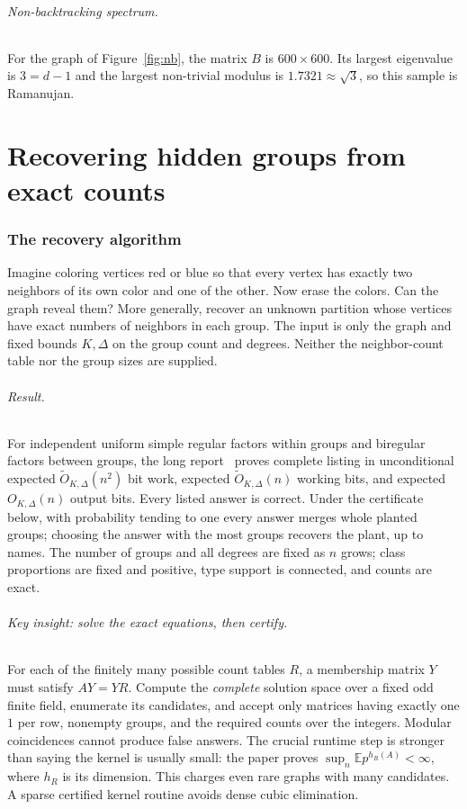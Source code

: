 \documentclass[11pt,letterpaper]{article}
\theoremstyle{definition}
\theoremstyle{remark}
\newcommand{\E}{\mathbb{E}}
\begin{document}
\paragraph{Non-backtracking spectrum.}
For the graph of Figure~\ref{fig:nb}, the matrix $B$ is $600\times600$. Its largest eigenvalue is
$3=d-1$ and the largest non-trivial modulus is $1.7321\approx\sqrt3$, so this sample is
Ramanujan.


\part{Recovering hidden groups from exact counts}
\section{The recovery algorithm}
Imagine coloring vertices red or blue so that every vertex has exactly two
neighbors of its own color and one of the other. Now erase the colors.
Can the graph reveal them? More generally, recover an unknown partition
whose vertices have exact numbers of neighbors in each group. The input is
only the graph and fixed bounds $K,\Delta$ on the group count and degrees.
Neither the neighbor-count table nor the group sizes are supplied.

\paragraph{Result.}
For independent uniform simple regular factors within groups and biregular
factors between groups, the long report~\cite{FullReport} proves complete
listing in unconditional expected $\widetilde O_{K,\Delta}(n^2)$ bit work,
expected $\widetilde O_{K,\Delta}(n)$ working bits, and expected $O_{K,\Delta}(n)$
output bits. Every listed answer is correct. Under the certificate below,
with probability tending to one every answer merges whole planted groups;
choosing the answer with the most groups recovers the plant, up to names.
The number of groups and all degrees are fixed as $n$ grows; class proportions
are fixed and positive, type support is connected, and counts are exact.

\paragraph{Key insight: solve the exact equations, then certify.}
For each of the finitely many possible count tables $R$, a membership matrix
$Y$ must satisfy $AY=YR$. Compute the \emph{complete} solution space over a
fixed odd finite field, enumerate its candidates, and accept only matrices
having exactly one $1$ per row, nonempty groups, and the required counts
over the integers. Modular coincidences cannot produce false answers.
The crucial runtime step is stronger than saying the kernel is usually small:
the paper proves $\sup_n\E p^{h_R(A)}<\infty$, where $h_R$ is its dimension.
This charges even rare graphs with many candidates. A sparse certified
kernel routine avoids dense cubic elimination.
\end{document}
